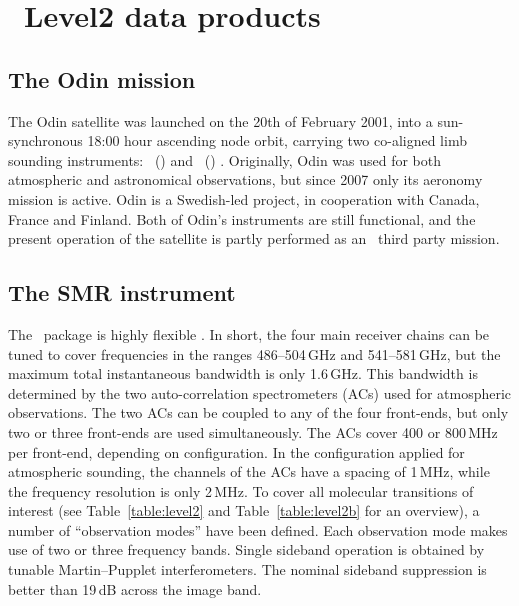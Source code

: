 \chapter{\smr\ Level2 data products}

\section{The Odin mission}
\label{sec:odin}
%

The Odin satellite was launched on the 20th of February 2001, into a sun-synchronous
18:00 hour ascending node orbit, carrying two co-aligned limb sounding
instruments: \OSIRIS\ (\OSIRISlong) and
\SMR\ (\SMRlong) \citep{murtagh:anove:02}. 
Originally, Odin was used for both
atmospheric and astronomical observations, but since 2007 only its aeronomy
mission is active. Odin is a Swedish-led project, in cooperation with Canada,
France and Finland. Both of Odin's instruments are still functional, and the
present operation of the satellite is partly performed as an \ESA\ third party
mission.

\section{The SMR instrument}

The \smr\ package is highly flexible \citep{frisk:theod:03}. 
In short, the four main receiver chains
can be tuned to cover frequencies in the ranges 486--504\,GHz and
541--581\,GHz, but the maximum total instantaneous bandwidth is only
1.6\,GHz. This bandwidth is determined by the two auto-correlation
spectrometers (ACs) used for atmospheric observations. The two ACs can be
coupled to any of the four front-ends, but only two or three front-ends are
used simultaneously. The ACs cover 400 or 800\,MHz per front-end, depending on
configuration. In the configuration applied for atmospheric sounding, the
channels of the ACs have a spacing of 1\,MHz, while the frequency resolution is
only 2\,MHz.
To cover all molecular transitions
of interest (see Table~\ref{table:level2} and Table~\ref{table:level2b} for an overview), 
a number of ``observation modes'' have been defined. Each
observation mode makes use of two or three frequency bands. Single sideband
operation is obtained by tunable Martin--Pupplet interferometers. The nominal
sideband suppression is better than 19\,dB across the image band.


